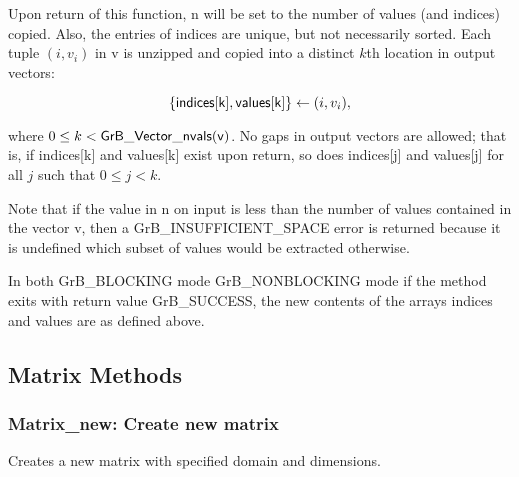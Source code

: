 Upon return of this function, {\sf n} will be set to the number of values (and 
indices) copied.  Also, the entries of {\sf indices} are unique, but not 
necessarily sorted.  Each tuple $(i,v_i)$ in {\sf v} is unzipped and copied 
into a distinct $k$th location in output vectors:

$$ \{{\sf indices[k]}, {\sf values[k]}\} \leftarrow (i,v_i),$$

where $0 \leq k < {\sf GrB\_Vector\_nvals(v)}$. No gaps in
output vectors are allowed; that is, if {\sf indices[k]} and {\sf values[k]} 
exist upon return, so does
{\sf indices[j]} and {\sf values[j]} for all $j$ such that $0 \leq j < k$.

Note that if the value in {\sf n} on input is less than the number of values
contained in the vector {\sf v}, then a {\sf GrB\_INSUFFICIENT\_SPACE} error 
is returned because it is undefined which subset of values would
be extracted otherwise.

In both {\sf GrB\_BLOCKING} mode {\sf GrB\_NONBLOCKING} mode
if the method exits with return value {\sf GrB\_SUCCESS}, the  new 
contents of the arrays {\sf indices} and {\sf values} are as defined above.  



\subsection{Matrix Methods}

\subsubsection{{\sf Matrix\_new}: Create new matrix}

Creates a new matrix with specified domain and dimensions.

\paragraph{\syntax}

